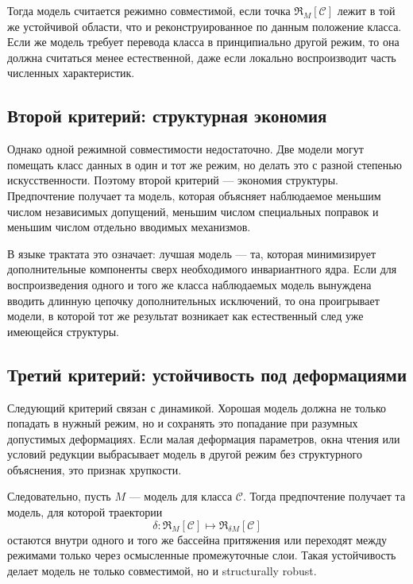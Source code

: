 \documentclass[12pt,a4paper]{article}
\begin{document}
Тогда модель считается режимно совместимой, если точка \(\mathfrak{R}_M[\mathcal{C}]\) лежит в той же устойчивой области, что и реконструированное по данным положение класса. Если же модель требует перевода класса в принципиально другой режим, то она должна считаться менее естественной, даже если локально воспроизводит часть численных характеристик.

\subsection{Второй критерий: структурная экономия}

Однако одной режимной совместимости недостаточно. Две модели могут помещать класс данных в один и тот же режим, но делать это с разной степенью искусственности. Поэтому второй критерий --- экономия структуры. Предпочтение получает та модель, которая объясняет наблюдаемое меньшим числом независимых допущений, меньшим числом специальных поправок и меньшим числом отдельно вводимых механизмов.

В языке трактата это означает: лучшая модель --- та, которая минимизирует дополнительные компоненты сверх необходимого инвариантного ядра. Если для воспроизведения одного и того же класса наблюдаемых модель вынуждена вводить длинную цепочку дополнительных исключений, то она проигрывает модели, в которой тот же результат возникает как естественный след уже имеющейся структуры.

\subsection{Третий критерий: устойчивость под деформациями}

Следующий критерий связан с динамикой. Хорошая модель должна не только попадать в нужный режим, но и сохранять это попадание при разумных допустимых деформациях. Если малая деформация параметров, окна чтения или условий редукции выбрасывает модель в другой режим без структурного объяснения, это признак хрупкости.

Следовательно, пусть \(M\) --- модель для класса \(\mathcal{C}\). Тогда предпочтение получает та модель, для которой траектории
\begin{equation}
\delta : \mathfrak{R}_M[\mathcal{C}] \longmapsto \mathfrak{R}_{\delta M}[\mathcal{C}]
\end{equation}
остаются внутри одного и того же бассейна притяжения или переходят между режимами только через осмысленные промежуточные слои. Такая устойчивость делает модель не только совместимой, но и structurally robust.
\end{document}
